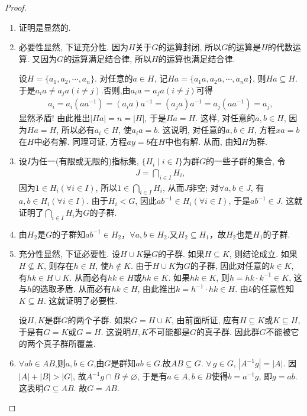 \documentclass[../../main.tex]{subfiles}%
\begin{document}
\begin{proof}
\begin{enumerate}[(1)]
\item 证明是显然的.

\item 必要性显然, 下证充分性.
因为$H$关于$G$的运算封闭, 所以$G$的运算是$H$的代数运算. 又因为$G$的运算满足结合律, 所以$H$的运算也满足结合律.

设$H=\{a_1,a_2,\cdots,a_n\}$. 对任意的$a\in H$, 记$Ha=\{a_1a,a_2a,\cdots,a_na\}$, 则$Ha\subseteq H$.
于是$a_ia\neq a_ja(i\neq j)$.否则,由$a_ia = a_ja(i\neq j)$可得
\begin{align*}
a_i=a_i(aa^{-1})=(a_ia)a^{-1}=(a_ja)a^{-1}=a_j(aa^{-1})=a_j,
\end{align*}
显然矛盾!
由此推出$|Ha|=n=|H|$, 于是$Ha=H$. 这样, 对任意的$a,b\in H$, 因为$Ha=H$, 所以必有$a_i\in H$, 使$a_ia=b$. 这说明, 对任意的$a,b\in H$, 方程$xa=b$在$H$中必有解. 同理可证, 方程$ay=b$在$H$中也有解. 从而, 由知$H$为群.

\item 设$I$为任一(有限或无限的)指标集, $\{H_i\mid i\in I\}$为群$G$的一些子群的集合, 令
\begin{align*}
J = \bigcap\limits_{i\in I} H_i,
\end{align*}
因为$1\in H_i(\forall i\in I)$, 所以$1\in \bigcap\limits_{i\in I} H_i$, 从而$J$非空;
对$\forall a,b\in J$, 有$a,b\in H_i(\forall i\in I)$. 由于$H_i < G$, 因此$ab^{-1}\in H_i(\forall i\in I)$, 于是$ab^{-1}\in J$.
这就证明了$\bigcap\limits_{i\in I} H_i$为$G$的子群.

\item 由$H_2$是$G$的子群知$ab^{-1} \in H_2$，$\forall a,b \in H_2$.又$H_2 \subseteq H_1$，故$H_2$也是$H_1$的子群.

\item 充分性显然, 下证必要性.
设$H\cup K$是$G$的子群. 如果$H\subseteq K$, 则结论成立. 如果$H\nsubseteq K$, 则存在$h\in H$, 使$h\notin K$. 由于$H\cup K$为$G$的子群, 因此对任意的$k\in K$, 有$hk\in H\cup K$. 从而必有$hk\in H$或$hk\in K$. 如果$hk\in K$, 则$h=hk\cdot k^{-1}\in K$, 这与$h$的选取矛盾. 从而必有$hk\in H$, 由此推出$k=h^{-1}\cdot hk\in H$. 由$k$的任意性知$K\subseteq H$. 这就证明了必要性.

设$H,K$是群$G$的两个子群. 如果$G=H\cup K$, 由前面所证, 应有$H\subseteq K$或$K\subseteq H$, 于是有$G=K$或$G=H$. 这说明$H,K$不可能都是$G$的真子群. 因此群$G$不能被它的两个真子群所覆盖.

\item $\forall ab\in AB$,则$a,b\in G$,由$G$是群知$ab\in G$.故$AB\subseteq G$.
$\forall\,g\in G$, $|A^{-1}g|=|A|$. 因$|A|+|B|>|G|$, 故$A^{-1}g\cap B\neq\varnothing$, 于是有$a\in A, b\in B$使得$b=a^{-1}g$, 即$g=ab$. 这表明$G\subseteq AB$.
故$G = AB$.
\end{enumerate}
\end{proof}
\end{document}
